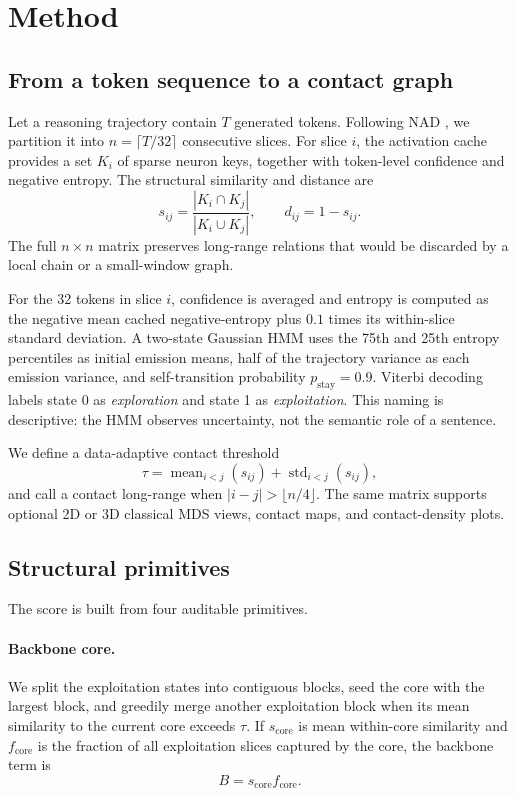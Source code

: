 \documentclass{article}
\begin{document}
\section{Method}

\subsection{From a token sequence to a contact graph}

Let a reasoning trajectory contain $T$ generated tokens. Following NAD \citep{chen2025nad}, we partition it into $n=\lceil T/32\rceil$ consecutive slices. For slice $i$, the activation cache provides a set $K_i$ of sparse neuron keys, together with token-level confidence and negative entropy. The structural similarity and distance are
\begin{equation}
s_{ij}=\frac{|K_i\cap K_j|}{|K_i\cup K_j|},
\qquad d_{ij}=1-s_{ij}.
\label{eq:jaccard}
\end{equation}
The full $n\times n$ matrix preserves long-range relations that would be discarded by a local chain or a small-window graph.

For the 32 tokens in slice $i$, confidence is averaged and entropy is computed as the negative mean cached negative-entropy plus $0.1$ times its within-slice standard deviation. A two-state Gaussian HMM uses the 75th and 25th entropy percentiles as initial emission means, half of the trajectory variance as each emission variance, and self-transition probability $p_{\mathrm{stay}}=0.9$. Viterbi decoding labels state 0 as \emph{exploration} and state 1 as \emph{exploitation}. This naming is descriptive: the HMM observes uncertainty, not the semantic role of a sentence.

We define a data-adaptive contact threshold
\begin{equation}
\tau=\operatorname{mean}_{i<j}(s_{ij})+\operatorname{std}_{i<j}(s_{ij}),
\end{equation}
and call a contact long-range when $|i-j|>\lfloor n/4\rfloor$. The same matrix supports optional 2D or 3D classical MDS views, contact maps, and contact-density plots.

\subsection{Structural primitives}

The score is built from four auditable primitives.

\paragraph{Backbone core.}
We split the exploitation states into contiguous blocks, seed the core with the largest block, and greedily merge another exploitation block when its mean similarity to the current core exceeds $\tau$. If $s_{\mathrm{core}}$ is mean within-core similarity and $f_{\mathrm{core}}$ is the fraction of all exploitation slices captured by the core, the backbone term is
\begin{equation}
B=s_{\mathrm{core}}f_{\mathrm{core}}.
\end{equation}
\end{document}
